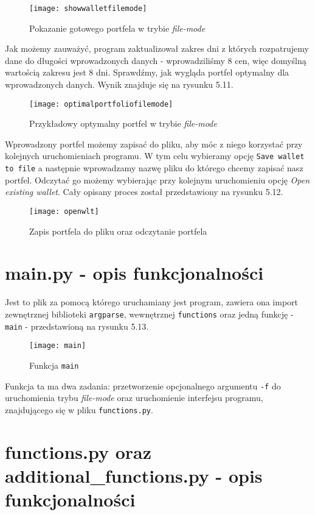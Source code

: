 \documentclass[magister]{dyplom}
\def\code#1{\texttt{#1}}
\begin{document}
\begin{figure}[ht]
	\centering
	\texttt{[image: showwalletfilemode]}
	\caption{Pokazanie gotowego portfela w trybie \textit{file-mode}}
\end{figure}

Jak możemy zauważyć, program zaktualizował zakres dni z których rozpatrujemy dane do długości wprowadzonych danych - wprowadziliśmy 8 cen, więc domyślną wartością zakresu jest 8 dni.
Sprawdźmy, jak wygląda portfel optymalny dla wprowadzonych danych. Wynik znajduje się na rysunku 5.11.

\begin{figure}[ht]
	\centering
	\texttt{[image: optimalportfoliofilemode]}
	\caption{Przykładowy optymalny portfel w trybie \textit{file-mode}}
\end{figure}

Wprowadzony portfel możemy zapisać do pliku, aby móc z niego korzystać przy kolejnych uruchomieniach programu. W tym celu wybieramy opcję \code{Save wallet to file} a następnie wprowadzamy nazwę pliku do którego chcemy zapisać nasz portfel. Odczytać go możemy wybierając przy kolejnym uruchomieniu opcję \textit{Open existing wallet}. Cały opisany proces został przedstawiony na rysunku 5.12.

\begin{figure}[ht]
	\centering
	\texttt{[image: openwlt]}
	\caption{Zapis portfela do pliku oraz odczytanie portfela}
\end{figure}

\section{main.py - opis funkcjonalności}
Jest to plik za pomocą którego uruchamiany jest program, zawiera ona import zewnętrznej biblioteki \code{argparse}, wewnętrznej \code{functions} oraz jedną funkcję - \code{main} - przedstawioną na rysunku 5.13.

\begin{figure}[ht]
	\centering
	\texttt{[image: main]}
	\caption{Funkcja \code{main}}
\end{figure}

Funkcja ta ma dwa zadania: przetworzenie opcjonalnego argumentu \code{-f} do uruchomienia trybu \textit{file-mode} oraz uruchomienie interfejsu programu, znajdującego się w pliku \code{functions.py}.\\


\section{functions.py oraz additional\_functions.py - opis funkcjonalności}
\end{document}
